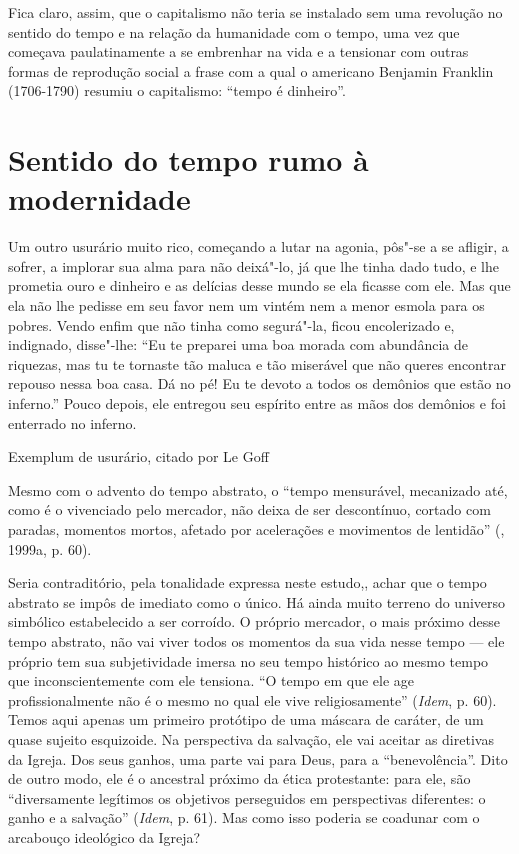 Fica claro, assim, que o capitalismo não teria se instalado sem uma
revolução no sentido do tempo e na relação da humanidade com o tempo,
uma vez que começava paulatinamente a se embrenhar na vida e a tensionar
com outras formas de reprodução social a frase com a qual o americano
Benjamin Franklin (1706-1790) resumiu o capitalismo: ``tempo é
dinheiro''.

\section{Sentido do tempo rumo à modernidade}

\epigraph{Um outro usurário muito rico, começando a lutar na agonia, pôs"-se a se
afligir, a sofrer, a implorar sua alma para não deixá"-lo, já que lhe
tinha dado tudo, e lhe prometia ouro e dinheiro e as delícias desse
mundo se ela ficasse com ele. Mas que ela não lhe pedisse em seu favor
nem um vintém nem a menor esmola para os pobres. Vendo enfim que não
tinha como segurá"-la, ficou encolerizado e, indignado, disse"-lhe: ``Eu
te preparei uma boa morada com abundância de riquezas, mas tu te
tornaste tão maluca e tão miserável que não queres encontrar repouso
nessa boa casa. Dá no pé! Eu te devoto a todos os demônios que estão no
inferno.'' Pouco depois, ele entregou seu espírito entre as mãos dos
demônios e foi enterrado no inferno.}{Exemplum de usurário, citado por Le Goff}

Mesmo com o advento do tempo abstrato, o ``tempo mensurável, mecanizado
até, como é o vivenciado pelo mercador, não deixa de ser descontínuo, cortado
com paradas, momentos mortos, afetado por acelerações e movimentos de
lentidão'' (, 1999a, p. 60).

Seria contraditório, pela tonalidade expressa neste estudo,, achar que o tempo
abstrato se impôs de imediato como o único. Há ainda muito terreno do
universo simbólico estabelecido a ser corroído. O próprio mercador, o
mais próximo desse tempo abstrato, não vai viver todos os momentos da
sua vida nesse tempo --- ele próprio tem sua subjetividade imersa no seu
tempo histórico ao mesmo tempo que inconscientemente com ele tensiona.
``O tempo em que ele age profissionalmente não é o mesmo no qual ele
vive religiosamente'' (\emph{Idem}, p. 60). Temos aqui apenas um
primeiro protótipo de uma máscara de caráter, de um quase sujeito
esquizoide. Na perspectiva da salvação, ele vai aceitar as diretivas da
Igreja. Dos seus ganhos, uma parte vai para Deus, para a
``benevolência''. Dito de outro modo, ele é o ancestral próximo da ética
protestante: para ele, são ``diversamente legítimos os objetivos
perseguidos em perspectivas diferentes: o ganho e a salvação''
(\emph{Idem}, p. 61). Mas como isso poderia se coadunar com o arcabouço
ideológico da Igreja?

